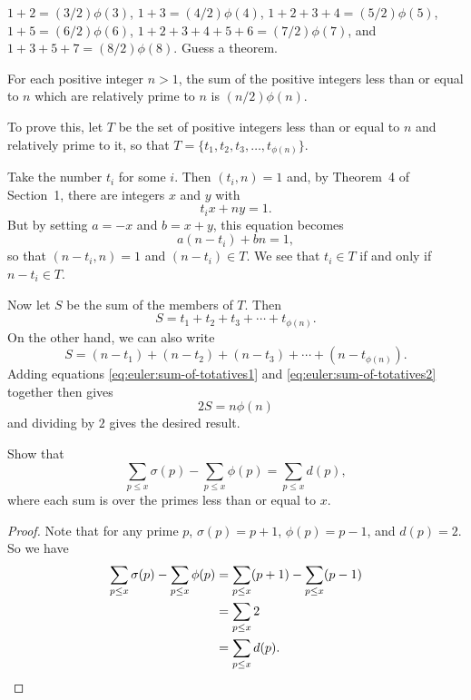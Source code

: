  $1 + 2 = (3/2)\phi(3)$, $1 + 3 = (4/2)\phi(4)$,
$1 + 2 + 3 + 4 = (5/2)\phi(5)$, $1 + 5 = (6/2)\phi(6)$,
$1 + 2 + 3 + 4 + 5 + 6 = (7/2)\phi(7)$, and
$1 + 3 + 5 + 7 = (8/2)\phi(8)$. Guess a theorem.
\begin{solution}
  For each positive integer $n > 1$, the sum of the positive integers
  less than or equal to $n$ which are relatively prime to $n$ is
  $(n/2)\phi(n)$.

  To prove this, let $T$ be the set of positive integers less than or
  equal to $n$ and relatively prime to it, so that
  $T = \{t_1,t_2,t_3,\dots,t_{\phi(n)}\}$.

  Take the number $t_i$ for some $i$. Then $(t_i,n) = 1$ and, by
  Theorem~4 of Section~1, there are integers $x$ and $y$ with
  \begin{equation*}
    t_ix + ny = 1.
  \end{equation*}
  But by setting $a = -x$ and $b = x + y$, this equation becomes
  \begin{equation*}
    a(n - t_i) + bn = 1,
  \end{equation*}
  so that $(n - t_i, n) = 1$ and $(n - t_i)\in T$. We see that
  $t_i\in T$ if and only if $n - t_i\in T$.

  Now let $S$ be the sum of the members of $T$. Then
  \begin{equation}
    \label{eq:euler:sum-of-totatives1}
    S = t_1 + t_2 + t_3 + \cdots + t_{\phi(n)}.
  \end{equation}
  On the other hand, we can also write
  \begin{equation}
    \label{eq:euler:sum-of-totatives2}
    S = (n - t_1) + (n - t_2) + (n - t_3) + \cdots + (n - t_{\phi(n)}).
  \end{equation}
  Adding equations \eqref{eq:euler:sum-of-totatives1} and
  \eqref{eq:euler:sum-of-totatives2} together then gives
  \begin{equation*}
    2S = n\phi(n)
  \end{equation*}
  and dividing by $2$ gives the desired result.
\end{solution}

 Show that
\begin{equation*}
  \sum_{p\leq x}\sigma(p) - \sum_{p\leq x}\phi(p) = \sum_{p\leq x}d(p),
\end{equation*}
where each sum is over the primes less than or equal to $x$.
\begin{proof}
  Note that for any prime $p$, $\sigma(p) = p + 1$, $\phi(p) = p - 1$,
  and $d(p) = 2$. So we have
  \begin{align*}
    \sum_{p\leq x}\sigma(p) - \sum_{p\leq x}\phi(p)
    &= \sum_{p\leq x}(p + 1) - \sum_{p\leq x}(p - 1) \\
    &= \sum_{p\leq x}2 \\
    &= \sum_{p\leq x}d(p). \qedhere
  \end{align*}
\end{proof}
